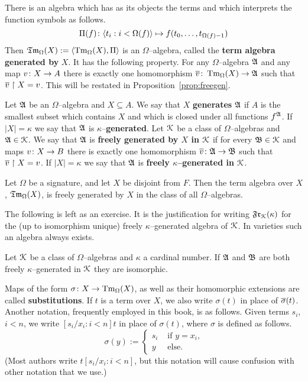 There is an algebra which has as its objects the terms and 
which interprets the function symbols as follows.
\begin{equation}
\Pi(f) \colon \langle t_i : i < \Omega(f)\rangle \mapsto
    f(t_0, \dotsc, t_{\Omega(f)-1}) 
\end{equation}
Then $\mathfrak{Tm}_{\Omega}(X) := \langle \operatorname{Tm}_{\Omega}(X), \Pi\rangle$ is
an $\Omega$--algebra, called the \textbf{term algebra generated by}
$X$. It has the following property. For any $\Omega$--algebra
$\mathfrak{A}$ and any map $v \colon X \rightarrow A$ there is exactly one homomorphism
$\overline{v} \colon \operatorname{Tm}_{\Omega}(X) \rightarrow \mathfrak{A}$ such that $\overline{v}
\restriction X = v$. This will be restated in 
Proposition~\ref{prop:freegen}.
\begin{defn}
Let $\mathfrak{A}$ be an $\Omega$--algebra and $X \subseteq A$. We say that
$X$ \textbf{generates} $\mathfrak{A}$ if $A$ is the smallest subset which
contains $X$ and which is closed under all functions $f^{\mathfrak{A}}$. If
$|X| = \kappa$ we say that $\mathfrak{A}$ is $\kappa$--\textbf{generated}.
Let $\mathcal{K}$ be a class of $\Omega$--algebras and $\mathfrak{A} \in \mathcal{K}$. We
say that $\mathfrak{A}$ is \textbf{freely generated by $X$ in $\mathcal{K}$} if for 
every $\mathfrak{B} \in \mathcal{K}$ and maps $v \colon X \rightarrow B$ there is exactly 
one homomorphism $\overline{v} \colon \mathfrak{A} \rightarrow \mathfrak{B}$ such that $\overline{v} 
\restriction X = v$. If $|X| = \kappa$ we say that $\mathfrak{A}$ is 
\textbf{freely $\kappa$--generated in} $\mathcal{K}$.
\end{defn}
\begin{prop}
\label{prop:freegen}
Let $\Omega$ be a signature, and let $X$ be disjoint from $F$. Then
the term algebra over $X$, $\mathfrak{Tm}_{\Omega}(X)$, is freely generated
by $X$ in the class of all $\Omega$--algebras.
\end{prop}
The following is left as an exercise. It is the justification
for writing $\mathfrak{Fr}_{\mathcal{K}}(\kappa)$ for the (up to isomorphism
unique) freely $\kappa$--generated algebra of $\mathcal{K}$. In varieties 
such an algebra always exists.
\begin{prop}
\label{prop:free}
Let $\mathcal{K}$ be a class of $\Omega$--algebras and $\kappa$ a
cardinal number. If $\mathfrak{A}$ and $\mathfrak{B}$ are both freely $\kappa$--generated
in $\mathcal{K}$ they are isomorphic.
\end{prop}
Maps of the form $\sigma \colon X \rightarrow \operatorname{Tm}_{\Omega}(X)$,
as well as their homomorphic extensions are called
\textbf{substitutions}. If $t$ is a term over $X$, we also write
$\sigma(t)$ in place of $\overline{\sigma}(t)$. Another notation,
frequently employed in this book, is as follows. Given terms
$s_i$, $i < n$, we write $[s_i/x_i \colon i < n]t$ in place of
$\sigma(t)$, where $\sigma$ is defined as follows.
\begin{equation}
\sigma(y) := \begin{cases}
    s_i & \text{ if $y = x_i$,} \\
    y   & \text{ else.}
\end{cases}
\end{equation}
(Most authors write $t[s_i/x_i \colon i < n]$, but this notation will
cause confusion with other notation that we use.)

